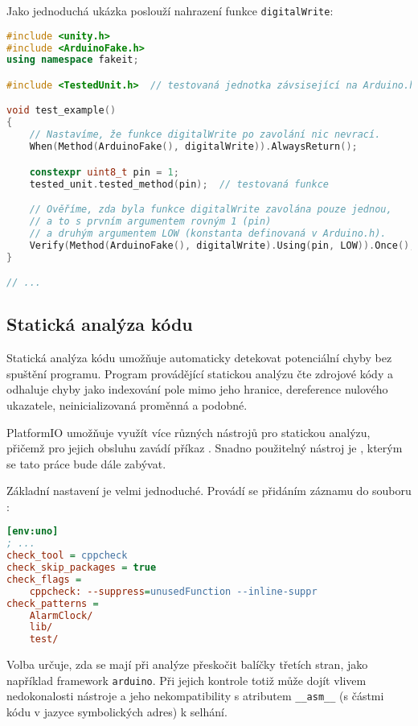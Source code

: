 Jako jednoduchá ukázka poslouží nahrazení funkce \texttt{digitalWrite}:
\begin{lstlisting}[language=C++]
#include <unity.h>
#include <ArduinoFake.h>
using namespace fakeit;

#include <TestedUnit.h>  // testovaná jednotka závsisející na Arduino.h

void test_example()
{
    // Nastavíme, že funkce digitalWrite po zavolání nic nevrací.
    When(Method(ArduinoFake(), digitalWrite)).AlwaysReturn();

    constexpr uint8_t pin = 1;
    tested_unit.tested_method(pin);  // testovaná funkce

    // Ověříme, zda byla funkce digitalWrite zavolána pouze jednou,
    // a to s prvním argumentem rovným 1 (pin)
    // a druhým argumentem LOW (konstanta definovaná v Arduino.h).
    Verify(Method(ArduinoFake(), digitalWrite).Using(pin, LOW)).Once();
}

// ...
\end{lstlisting}


\subsection{Statická analýza kódu}
Statická analýza kódu umožňuje automaticky detekovat potenciální chyby bez
spuštění programu. Program provádějící statickou analýzu čte zdrojové kódy
a odhaluje chyby jako indexování pole mimo jeho hranice, dereference nulového
ukazatele, neinicializovaná proměnná a podobné.

PlatformIO umožňuje využít více různých nástrojů pro statickou analýzu, přičemž
pro jejich obsluhu zavádí příkaz . Snadno použitelný
nástroj je , kterým se tato práce bude dále zabývat.

Základní nastavení je velmi jednoduché. Provádí se přidáním záznamu do souboru
:
\begin{lstlisting}[language=Ini]
[env:uno]
; ...
check_tool = cppcheck
check_skip_packages = true
check_flags = 
	cppcheck: --suppress=unusedFunction --inline-suppr
check_patterns = 
	AlarmClock/
	lib/
	test/
\end{lstlisting}
Volba  určuje, zda se mají při analýze přeskočit
balíčky třetích stran, jako například framework \texttt{arduino}. Při jejich
kontrole totiž může dojít vlivem nedokonalosti nástroje 
a jeho nekompatibility s atributem \lstinline[language={[GNU]C++}]!__asm__!
(s částmi kódu v jazyce symbolických adres) k selhání.

